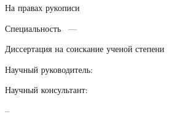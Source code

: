 
%
%
%
%

\thispagestyle{empty}

\begin{center}
\dissorg
\par
\end{center}

\vspace{10mm}
\begin{flushright}
На правах рукописи

{\sl \dissudk}
\end{flushright}

\vspace{20mm}
\begin{center}
{\large \dissauthor}
\end{center}

\vspace{5mm}
\begin{center}
{\bf \large \disstitle
\par}

\vspace{10mm}
{%
Специальность \specnum~---

\specname
}

\vspace{10mm}
Диссертация на соискание ученой степени

\edudegree
\end{center}

\vspace{5mm}
\begin{flushright}
Научный руководитель:

\mentordegree

\mentorname
\end{flushright}

\begin{flushright}
Научный консультант:

\consultantdegree

\consultantname

\end{flushright}

\vfill
\begin{center}
{\disscity -- \dissyear}
\end{center}

